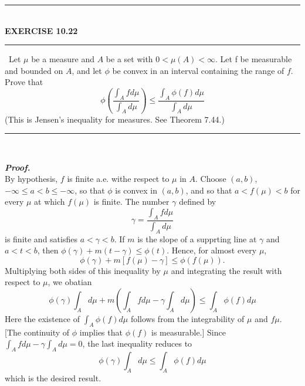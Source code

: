 \documentclass[a4paper,11pt]{article}
\begin{document}
	\begin{flushleft}
		\rule[-0.5ex]{17cm}{2pt}\\
			\textbf{EXERCISE 10.22}\\
		\rule[1.5ex]{17cm}{0.5pt}\
		Let $\mu$ be a measure and $A$ be a set with $0 < \mu(A) < \infty$. Let f be measurable and bounded on $A$, and let $\phi$ be convex in an interval containing the range of $f$. Prove that
			$$\phi\left( \frac{\int_A f d\mu}{\int_A d\mu} \right)
			\leq \frac{\int_A \phi(f) d\mu}{\int_A d\mu}$$
		(This is Jensen’s inequality for measures. See Theorem 7.44.)\\
	\rule[1.0ex]{17cm}{0.5pt}\
	\end{flushleft}
	\textit{\textbf {Proof.}}\\
	By hypothesis, $f$ is finite a.e. withe respect to $\mu$ in $A$. Choose $(a,b)$, $-\infty \leq a < b \leq -\infty$, so that $\phi$ is convex in $(a,b)$, and so that $a < f(\mu) < b$ for every $\mu$ at which $f(\mu)$ is finite. The number $\gamma$ defined by
		$$\gamma = \frac{\int_A f d\mu}{\int_A d\mu}$$
	is finite and satisfies $a < \gamma < b$. If $m$ is the slope of a supprting line at $\gamma$ and $a < t < b$, then $\phi(\gamma) + m(t - \gamma) \leq \phi(t)$. Hence, for almost every $\mu$,
		$$\phi(\gamma) + m[f(\mu) - \gamma] \leq \phi(f(\mu)).$$
	Multiplying both sides of this inequality by $\mu$ and integrating the result with respect to $\mu$, we obatian
		$$\phi(\gamma) \int_A d\mu + m \left( \int_A f d\mu - \gamma \int_A d\mu \right)
		\leq \int_A \phi(f) d\mu$$
	Here the existence of $\int_A \phi(f) d\mu$ follows from the integrability of $\mu$ and $f \mu$. [The continuity of $\phi$ implies that $\phi(f)$ is measurable.] Since $\int_A f d\mu - \gamma \int_A d\mu = 0$, the last inequality reduces to
		$$\phi(\gamma) \int_A d\mu \leq \int_A \phi(f) d\mu$$
	which is the desired result.\\
\end{document}
